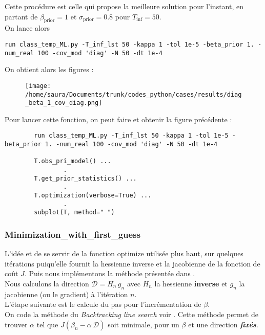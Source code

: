 \documentclass[a4paper,12pt]{article}
\newcommand{\bepar}[1]{
	\left( #1 \right)  
}
\newcommand\bk{\color{black}}
\newcommand\navy{\color{navy}}
\numberwithin{equation}{section} %
\begin{document}
\noindent Cette procédure est celle qui propose la meilleure solution pour l'instant, en partant de $\beta_{\text{prior}} = 1$ et $\sigma_{\text{prior}}=0.8$ pour $T_{\text{inf}} = 50$.\\
On lance alors 
\begin{lstlisting}
run class_temp_ML.py -T_inf_lst 50 -kappa 1 -tol 1e-5 -beta_prior 1. -num_real 100 -cov_mod 'diag' -N 50 -dt 1e-4
\end{lstlisting}
\vspace{1cm}
\noindent On obtient alors les figures : 

\pagebreak

\begin{figure}[!ht]

\texttt{[image: /home/saura/Documents/trunk/codes\_python/cases/results/diag\_beta\_1\_cov\_diag.png]}
\end{figure}

\noindent Pour lancer cette fonction, on peut faire et obtenir la figure précédente :
\begin{lstlisting}
		run class_temp_ML.py -T_inf_lst 50 -kappa 1 -tol 1e-5 -beta_prior 1. -num_real 100 -cov_mod 'diag' -N 50 -dt 1e-4
	
		T.obs_pri_model() ...
				.
	    T.get_prior_statistics() ...
	    		.
	    T.optimization(verbose=True) ...
				.
		subplot(T, method=" ")    
\end{lstlisting}

\navy\subsubsection*{Minimization\_with\_first\_guess}\bk
L'idée et de se servir de la fonction optimize utilisée plus haut, sur quelques itérations puiqu'elle fournit la hessienne inverse et la jacobienne de la fonction de coût $J$. Puis nous implémentons la méthode présentée dans \cite{aria}. \\
Nous calculons la direction $\mathcal{D} = H_n\, g_n$ avec $H_n$ la hessienne \textbf{inverse} et $g_n$ la jacobienne (ou le gradient) à l'itération $n$.\\
L'étape suivante est le calcule du pas pour l'incrémentation de $\beta$. \\
On code la méthode du \textit{Backtracking line search} voir \cite{backline}. Cette méthode permet de trouver $\alpha$ tel que $J\bepar{\beta_n - \alpha\,\mathcal{D}}$ soit minimale, pour un $\beta$ et une direction \textbf{\textit{fixés}}. \\
\end{document}

